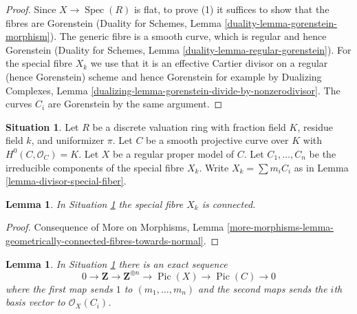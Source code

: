 \documentclass{stacks-project}
\theoremstyle{plain}
\newtheorem{lemma}[subsection]{Lemma}
\theoremstyle{definition}
\newtheorem{situation}[subsection]{Situation}
\theoremstyle{remark}
\numberwithin{equation}{subsection}
\def\Spec{\mathop{\mathrm{Spec}}}
\def\Pic{\mathop{\mathrm{Pic}}\nolimits}
\begin{document}
\begin{proof}
Since $X \to \Spec(R)$ is flat, to prove (1)
it suffices to show that the fibres are Gorenstein
(Duality for Schemes, Lemma \ref{duality-lemma-gorenstein-morphism}).
The generic fibre is a smooth curve, which is regular and hence Gorenstein
(Duality for Schemes, Lemma \ref{duality-lemma-regular-gorenstein}).
For the special fibre $X_k$ we use that it is an effective
Cartier divisor on a regular (hence Gorenstein) scheme and hence
Gorenstein for example by Dualizing Complexes, Lemma
\ref{dualizing-lemma-gorenstein-divide-by-nonzerodivisor}.
The curves $C_i$ are Gorenstein by the same argument.
\end{proof}

\begin{situation}
\label{situation-regular-model}
Let $R$ be a discrete valuation ring with fraction field $K$,
residue field $k$, and uniformizer $\pi$.
Let $C$ be a smooth projective curve over $K$ with $H^0(C, \mathcal{O}_C) = K$.
Let $X$ be a regular proper model of $C$.
Let $C_1, \ldots, C_n$ be the irreducible components of the special
fibre $X_k$. Write $X_k = \sum m_i C_i$ as in
Lemma \ref{lemma-divisor-special-fiber}.
\end{situation}

\begin{lemma}
\label{lemma-regular-model-connected}
In Situation \ref{situation-regular-model} the special fibre $X_k$ is connected.
\end{lemma}

\begin{proof}
Consequence of More on Morphisms, Lemma
\ref{more-morphisms-lemma-geometrically-connected-fibres-towards-normal}.
\end{proof}

\begin{lemma}
\label{lemma-regular-model-pic}
In Situation \ref{situation-regular-model} there is an exact sequence
$$
0 \to \mathbf{Z} \to \mathbf{Z}^{\oplus n} \to
\Pic(X) \to \Pic(C) \to 0
$$
where the first map sends $1$ to $(m_1, \ldots, m_n)$ and the second
maps sends the $i$th basis vector to $\mathcal{O}_X(C_i)$.
\end{lemma}
\end{document}

